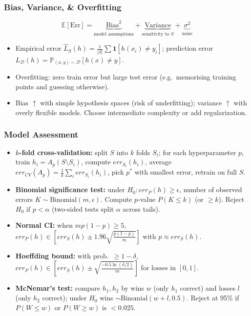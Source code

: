\documentclass[10pt]{article}
\begin{document}
\begin{multicols}{2}
\subsubsection*{Bias, Variance, \& Overfitting}
\[
\mathbb{E}[\text{Err}] = \underbrace{\text{Bias}^2}_{\text{model assumptions}} + \underbrace{\text{Variance}}_{\text{sensitivity to }S} + \underbrace{\sigma^2}_{\text{noise}}
\]
\begin{itemize}
    \item Empirical error $\hat{L}_S(h)=\frac{1}{|S|}\sum \mathbf{1}[h(x_i)\neq y_i]$; prediction error $L_{\mathcal{D}}(h)=\mathbb{P}_{(x,y)\sim\mathcal{D}}[h(x)\neq y]$.
    \item Overfitting: zero train error but large test error (e.g.\ memorising training points and guessing otherwise).
    \item Bias $\uparrow$ with simple hypothesis spaces (risk of underfitting); variance $\uparrow$ with overly flexible models. Choose intermediate complexity or add regularization.
\end{itemize}

\subsubsection*{Model Assessment}
\begin{itemize}
    \item \textbf{$k$-fold cross-validation:} split $S$ into $k$ folds $S_i$; for each hyperparameter $p$, train $h_i=A_p(S\setminus S_i)$, compute $err_{S_i}(h_i)$, average $err_{CV}(A_p)=\frac{1}{k}\sum_i err_{S_i}(h_i)$, pick $p^*$ with smallest error, retrain on full $S$.
    \item \textbf{Binomial significance test:} under $H_0:err_P(h)\ge \epsilon$, number of observed errors $K\sim\text{Binomial}(m,\epsilon)$. Compute $p$-value $P(K\le k)$ (or $\ge k$). Reject $H_0$ if $p<\alpha$ (two-sided tests split $\alpha$ across tails).
    \item \textbf{Normal CI:} when $mp(1-p)\ge5$, $err_P(h)\in \left[err_S(h)\pm1.96\sqrt{\frac{p(1-p)}{m}}\right]$ with $p\approx err_S(h)$.
    \item \textbf{Hoeffding bound:} with prob.\ $\ge 1-\delta$, $err_P(h)\in\left[err_S(h)\pm\sqrt{\frac{-0.5\ln(\delta/2)}{m}}\right]$ for losses in $[0,1]$.
    \item \textbf{McNemar's test:} compare $h_1,h_2$ by wins $w$ (only $h_1$ correct) and losses $l$ (only $h_2$ correct); under $H_0$ wins $\sim \text{Binomial}(w+l,0.5)$. Reject at 95\% if $P(W\le w)$ or $P(W\ge w)$ is $<0.025$.
\end{itemize}


\end{multicols}
\end{document}
